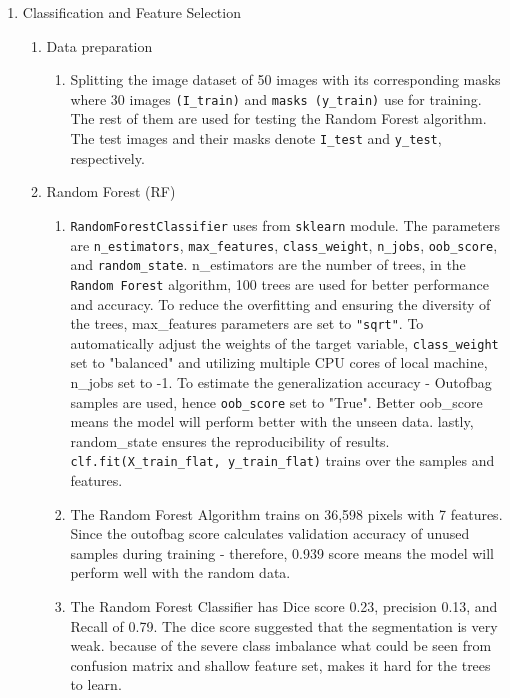 \documentclass[
    a4paper,
    12pt,
    parskip=half,
]{scrarticle}
\begin{document}
\begin{enumerate}
    \item Classification and Feature Selection
    \begin{enumerate}[label=\theenumi.\arabic*.]
        \item Data preparation
        \begin{enumerate}[label=\alph*)]
            \item Splitting the image dataset of 50 images with its corresponding masks where 30 images \texttt{(I\_train)}  and \texttt{masks (y\_train)} use for training. The rest of them are used for testing the Random Forest algorithm. The test images and their masks denote \texttt{I\_test} and \texttt{y\_test}, respectively.
        \end{enumerate}
        \item Random Forest (RF)
        \begin{enumerate}[label=\alph*)]
            \item \texttt{RandomForestClassifier} uses from \texttt{sklearn} module. The parameters are \texttt{n\_estimators}, \texttt{max\_features}, \texttt{class\_weight}, \texttt{n\_jobs}, \texttt{oob\_score}, and \texttt{random\_state}. n\_estimators are the number of trees, in the \texttt{Random Forest} algorithm, 100 trees are used for better performance and accuracy.
            To reduce the overfitting and ensuring the diversity of the trees, max\_features parameters are set to \texttt{"sqrt"}. To automatically adjust the weights of the target variable, \texttt{class\_weight} set to "balanced" and utilizing multiple CPU cores of local machine, n\_jobs set to -1. To estimate the generalization accuracy - Out\-of\-bag samples are used, hence \texttt{oob\_score} set to "True". Better oob\_score means the model will perform better with the unseen data. lastly, random\_state ensures the reproducibility of results. \texttt{clf.fit(X\_train\_flat, y\_train\_flat)} trains over the samples and features. 
            \item The Random Forest Algorithm trains on 36,598 pixels with 7 features. Since the out\-of\-bag score calculates validation accuracy of unused samples during training - therefore, 0.939 score means the model will perform well with the random data.
            \item The Random Forest Classifier has Dice score 0.23, precision 0.13, and Recall of 0.79. The dice score suggested that the segmentation is very weak. because of the severe class imbalance what could be seen from confusion matrix and shallow feature set, makes it hard for the trees to learn.  
        \end{enumerate}
        

\end{enumerate}
\end{enumerate}
\end{document}
